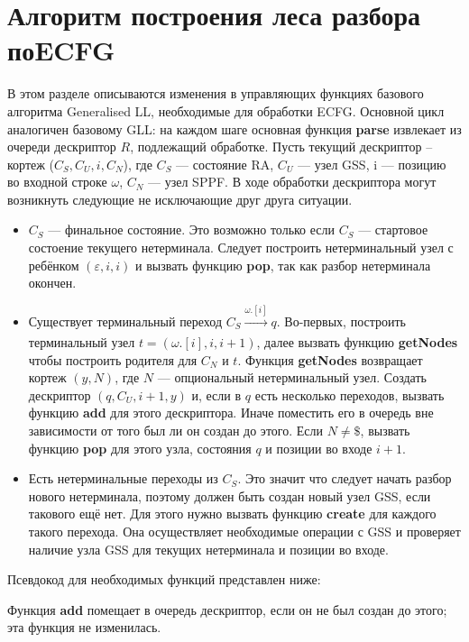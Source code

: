 \documentclass[14pt]{matmex-diploma-custom}
\begin{document}
	\section{Алгоритм построения леса разбора по\newline ECFG}
	В этом разделе описываются изменения в управляющих функциях базового алгоритма 
	Generalised LL, необходимые для обработки ECFG. Основной цикл аналогичен базовому
	GLL: на каждом шаге основная функция \textbf{parse} извлекает из очереди дескриптор
	$R$, подлежащий обработке. Пусть текущий дескриптор -- кортеж ($C_S, C_U, i, C_N$),
	где $C_S$ --- состояние RA, $C_U$ --- узел GSS, i --- позицию во входной строке 
	$\omega$, $C_N$ --- узел SPPF. В ходе обработки дескриптора могут возникнуть следующие
	не исключающие друг друга ситуации.
	\begin{itemize} 
		\item $C_S$ --- финальное состояние. Это возможно только если $C_S$
		--- стартовое состоение текущего нетерминала. Следует построить нетерминальный
		узел с ребёнком $(\varepsilon, i, i)$ и вызвать функцию \textbf{pop}, так как
		разбор нетерминала окончен.
		
		\item Существует терминальный переход $C_S \xrightarrow[]{\omega.[i]} q$.
		Во-первых, построить терминальный узел $ t = (\omega.[i], i, i+1) $, далее 
		вызвать функцию \textbf{getNodes} чтобы построить родителя для $ C_N $ и $ t $. 
		Функция \textbf{getNodes} возвращает кортеж $ (y, N) $, где $N$ --- опциональный
		нетерминальный узел. Создать дескриптор $ (q, C_U, i+1, y) $ и, если
        в $q$ есть несколько переходов, вызвать функцию \textbf{add} для этого дескриптора.
        Иначе поместить его в очередь вне зависимости от того был ли он создан до этого. 
        Если $ N \neq \$$,
		вызвать функцию \textbf{pop} для этого узла, состояния $ q $ и позиции во
		входе $ i + 1 $.
		
		\item Есть нетерминальные переходы из $C_S$.
		Это значит что следует начать разбор нового нетерминала, поэтому должен быть
		создан новый узел GSS, если такового ещё нет. Для этого нужно вызвать функцию
		\textbf{create} для каждого такого перехода. Она осуществляет необходимые
		операции с GSS и проверяет наличие узла GSS для текущих нетерминала и 
		позиции во входе.
	\end{itemize}
	Псевдокод для необходимых функций представлен ниже:
	
	Функция \textbf{add} помещает в очередь дескриптор, если он не был создан до этого; эта функция не изменилась.
	
	
\end{document}
